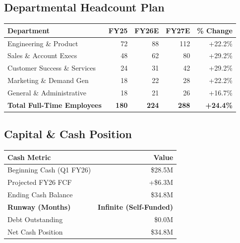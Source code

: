 \documentclass[10pt,a4paper]{article}
\begin{document}
\noindent
\begin{minipage}[t]{0.58\textwidth}
  \subsection{Departmental Headcount Plan}
  \vspace{-2pt}
  \begin{tcolorbox}[tablebox]
    \small
    \begin{tabularx}{\textwidth}{X r r r r}
      \toprule
      \textbf{Department} & \textbf{FY25} & \textbf{FY26E} & \textbf{FY27E} & \textbf{\% Change} \\
      \midrule
      Engineering \& Product & 72 & 88 & 112 & +22.2\% \\
      Sales \& Account Execs & 48 & 62 & 80 & +29.2\% \\
      Customer Success \& Services & 24 & 31 & 42 & +29.2\% \\
      Marketing \& Demand Gen & 18 & 22 & 28 & +22.2\% \\
      General \& Administrative & 18 & 21 & 26 & +16.7\% \\
      \midrule
      \textbf{Total Full-Time Employees} & \textbf{180} & \textbf{224} & \textbf{288} & \textbf{+24.4\%} \\
      \bottomrule
    \end{tabularx}
  \end{tcolorbox}
\end{minipage}%
\hfill
\begin{minipage}[t]{0.39\textwidth}
  \subsection{Capital \& Cash Position}
  \vspace{-2pt}
  \begin{tcolorbox}[tablebox]
    \small
    \begin{tabularx}{\textwidth}{X r}
      \toprule
      \textbf{Cash Metric} & \textbf{Value} \\
      \midrule
      Beginning Cash (Q1 FY26) & \$28.5M \\
      Projected FY26 FCF & +\$6.3M \\
      Ending Cash Balance & \$34.8M \\
      \textbf{Runway (Months)} & \textbf{Infinite (Self-Funded)} \\
      Debt Outstanding & \$0.0M \\
      Net Cash Position & \$34.8M \\
      \bottomrule
    \end{tabularx}
  \end{tcolorbox}
\end{minipage}
\end{document}
